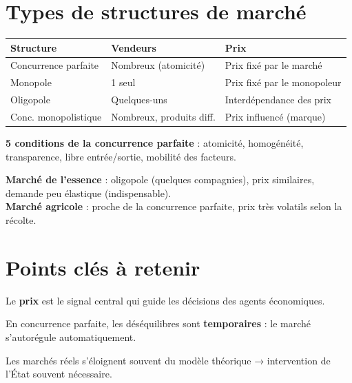 \documentclass[11pt,a4paper]{article}
\begin{document}
\section*{Types de structures de marché}

\begin{center}
\begin{tabular}{|l|l|l|}
\hline
\textbf{Structure} & \textbf{Vendeurs} & \textbf{Prix} \\
\hline
Concurrence parfaite & Nombreux (atomicité) & Prix fixé par le marché \\
Monopole & 1 seul & Prix fixé par le monopoleur \\
Oligopole & Quelques-uns & Interdépendance des prix \\
Conc. monopolistique & Nombreux, produits diff. & Prix influencé (marque) \\
\hline
\end{tabular}
\end{center}

\begin{keybox}
\textbf{5 conditions de la concurrence parfaite} : atomicité, homogénéité, transparence, libre entrée/sortie, mobilité des facteurs.
\end{keybox}

\vspace{4pt}
\begin{exbox}
\textbf{Marché de l'essence} : oligopole (quelques compagnies), prix similaires, demande peu élastique (indispensable).\\
\textbf{Marché agricole} : proche de la concurrence parfaite, prix très volatils selon la récolte.
\end{exbox}

\section*{Points clés à retenir}

\begin{keybox}
Le \textbf{prix} est le signal central qui guide les décisions des agents économiques.
\end{keybox}
\vspace{3pt}
\begin{keybox}
En concurrence parfaite, les déséquilibres sont \textbf{temporaires} : le marché s'autorégule automatiquement.
\end{keybox}
\vspace{3pt}
\begin{keybox}
Les marchés réels s'éloignent souvent du modèle théorique → intervention de l'État souvent nécessaire.
\end{keybox}
\end{document}
